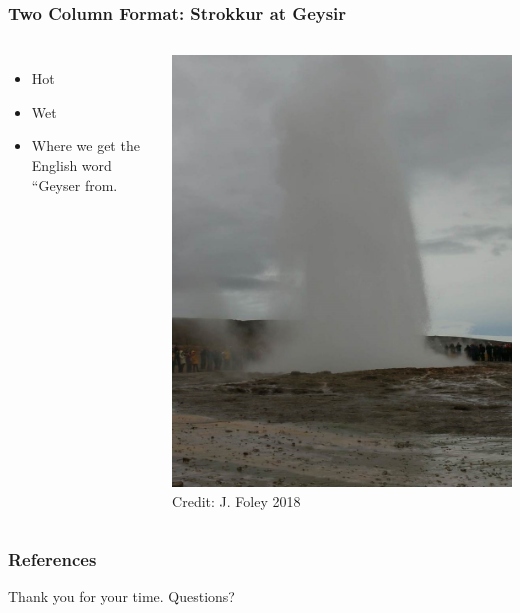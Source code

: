 \documentclass[aspectratio=169]{rubeamer}
\begin{document}

\begin{frame}
  \frametitle{Two Column Format:  Strokkur at Geysir}
  \begin{columns}
    \begin{itemize}
    \item Hot
    \item Wet
    \item Where we get the English word ``Geyser from.
    \end{itemize}
    \includegraphics[height=0.75\textheight]{geysir-strokkur-2crop}\\
    Credit: J. Foley 2018
  \end{columns}
\end{frame}

\begin{frame}[allowframebreaks]
  \frametitle{References}
  Thank you for your time.
  Questions?
  \printbibliography{}

\end{frame}
\end{document}
